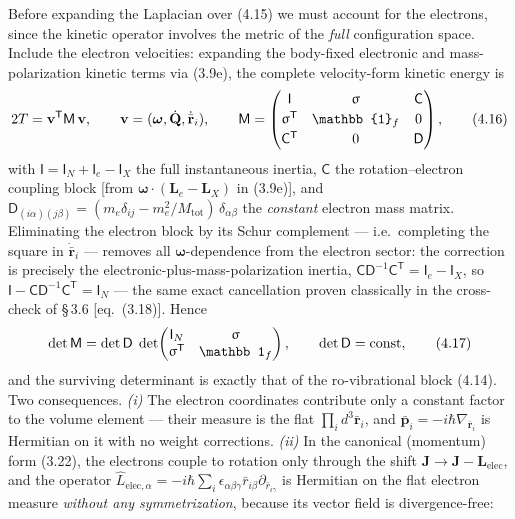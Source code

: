 Before expanding the Laplacian over (4.15) we must account for the electrons, since the kinetic operator involves the metric of the \emph{full} configuration space. Include the electron velocities: expanding the body-fixed electronic and mass-polarization kinetic terms via (3.9e), the complete velocity-form kinetic energy is
\begin{equation}
2T = \mathbf{v}^{\mathsf T}\mathsf{M}\,\mathbf{v},\qquad
\mathbf v=(\boldsymbol\omega,\dot{\mathbf Q},\dot{\bar{\mathbf r}}_i),\qquad
\mathsf{M}=\begin{pmatrix}\mathsf{I} & \Msig & \mathsf{C}\\[2pt] \Msig^{\mathsf T} & \mathbb{1}_f & 0\\[2pt] \mathsf{C}^{\mathsf T} & 0 & \mathsf{D}\end{pmatrix},
\tag{4.16}
\end{equation}
with $\mathsf{I}=\mathsf{I}_N+\mathsf{I}_e-\mathsf{I}_X$ the full instantaneous inertia, $\mathsf{C}$ the rotation--electron coupling block [from $\boldsymbol\omega\!\cdot\!(\mathbf{L}_e-\mathbf{L}_X)$ in (3.9e)], and $\mathsf{D}_{(i\alpha)(j\beta)}=(m_e\delta_{ij}-m_e^2/M_{\mathrm{tot}})\,\delta_{\alpha\beta}$ the \emph{constant} electron mass matrix. Eliminating the electron block by its Schur complement --- i.e.\ completing the square in $\dot{\bar{\mathbf r}}_i$ --- removes all $\boldsymbol\omega$-dependence from the electron sector: the correction is precisely the electronic-plus-mass-polarization inertia, $\mathsf{C}\mathsf{D}^{-1}\mathsf{C}^{\mathsf T}=\mathsf{I}_e-\mathsf{I}_X$, so $\mathsf{I}-\mathsf{C}\mathsf{D}^{-1}\mathsf{C}^{\mathsf T}=\mathsf{I}_N$ --- the same exact cancellation proven classically in the cross-check of \S\,3.6 [eq.~(3.18)]. Hence
\begin{equation}
\det\mathsf{M}
=\det\mathsf{D}\;\det\!\begin{pmatrix}\mathsf{I}_N & \Msig\\ \Msig^{\mathsf T} & \mathbb 1_f\end{pmatrix},
\qquad \det\mathsf D=\text{const}, \tag{4.17}
\end{equation}
and the surviving determinant is exactly that of the ro-vibrational block (4.14). Two consequences. \emph{(i)} The electron coordinates contribute only a constant factor to the volume element --- their measure is the flat $\prod_id^3\bar{\mathbf r}_i$, and $\hat{\bar{\mathbf p}}_i=-i\hbar\nabla_{\bar{\mathbf r}_i}$ is Hermitian on it with no weight corrections. \emph{(ii)} In the canonical (momentum) form (3.22), the electrons couple to rotation only through the shift $\mathbf J\to\mathbf J-\mathbf L_{\mathrm{elec}}$, and the operator $\hat L_{\mathrm{elec},\alpha}=-i\hbar\sum_i\epsilon_{\alpha\beta\gamma}\bar r_{i\beta}\partial_{\bar r_{i\gamma}}$ is Hermitian on the flat electron measure \emph{without any symmetrization}, because its vector field is divergence-free:
